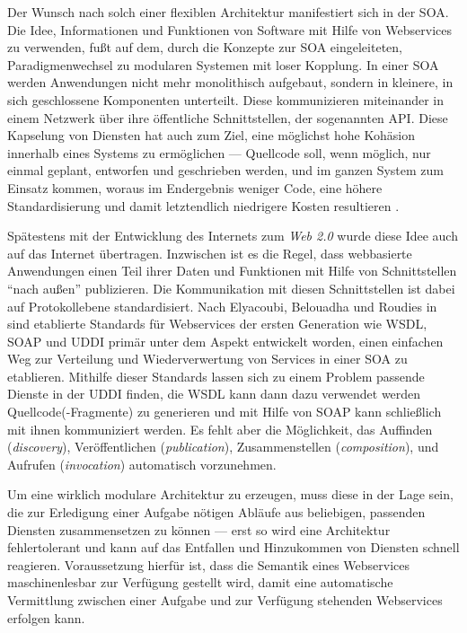 \label{l:soa}Der Wunsch nach solch einer flexiblen Architektur manifestiert sich in der \ac{SOA}. Die Idee, Informationen und Funktionen von Software mit Hilfe von Webservices zu verwenden, fußt auf dem, durch die Konzepte zur \ac{SOA} eingeleiteten, Paradigmenwechsel zu modularen Systemen mit loser Kopplung. In einer \ac{SOA} werden Anwendungen nicht mehr monolithisch aufgebaut, sondern in kleinere, in sich geschlossene Komponenten unterteilt. Diese kommunizieren miteinander in einem Netzwerk über ihre öffentliche Schnittstellen, der sogenannten API. Diese Kapselung von Diensten hat auch zum Ziel, eine möglichst hohe Kohäsion innerhalb eines Systems zu ermöglichen --- Quellcode soll, wenn möglich, nur einmal geplant, entworfen und geschrieben werden, und im ganzen System zum Einsatz kommen, woraus im Endergebnis weniger Code, eine höhere Standardisierung und damit letztendlich niedrigere Kosten resultieren \cite[S.62]{hn-web20}. 

Spätestens mit der Entwicklung des Internets zum \emph{Web 2.0} wurde diese Idee auch auf das Internet übertragen. Inzwischen ist es die Regel, dass webbasierte Anwendungen einen Teil ihrer Daten und Funktionen mit Hilfe von Schnittstellen "`nach außen"' publizieren. Die Kommunikation mit diesen Schnittstellen ist dabei auf Protokollebene standardisiert. Nach Elyacoubi, Belouadha und Roudies in \cite[S.653]{ei-sawsdl} sind etablierte Standards für Webservices der ersten Generation wie \ac{WSDL}, \ac{SOAP} und \ac{UDDI} primär unter dem Aspekt entwickelt worden, einen einfachen Weg zur Verteilung und Wiederverwertung von Services in einer \ac{SOA} zu etablieren. Mithilfe dieser Standards lassen sich zu einem Problem passende Dienste in der \ac{UDDI} finden, die \ac{WSDL} kann dann dazu verwendet werden Quellcode(-Fragmente) zu generieren und mit Hilfe von \ac{SOAP} kann schließlich mit ihnen kommuniziert werden. Es fehlt aber die Möglichkeit, das Auffinden (\emph{discovery}), Veröffentlichen (\emph{publication}), Zusammenstellen (\emph{composition}), und Aufrufen (\emph{invocation}) automatisch vorzunehmen.

\label{l:intro-loosecoupling}Um eine wirklich modulare Architektur zu erzeugen, muss diese in der Lage sein, die zur Erledigung einer Aufgabe nötigen Abläufe aus beliebigen, passenden Diensten zusammensetzen zu können --- erst so wird eine Architektur fehlertolerant und kann auf das Entfallen und Hinzukommen von Diensten schnell reagieren. Voraussetzung hierfür ist, dass die Semantik eines Webservices maschinenlesbar zur Verfügung gestellt wird, damit eine automatische Vermittlung zwischen einer Aufgabe und zur Verfügung stehenden Webservices erfolgen kann.


